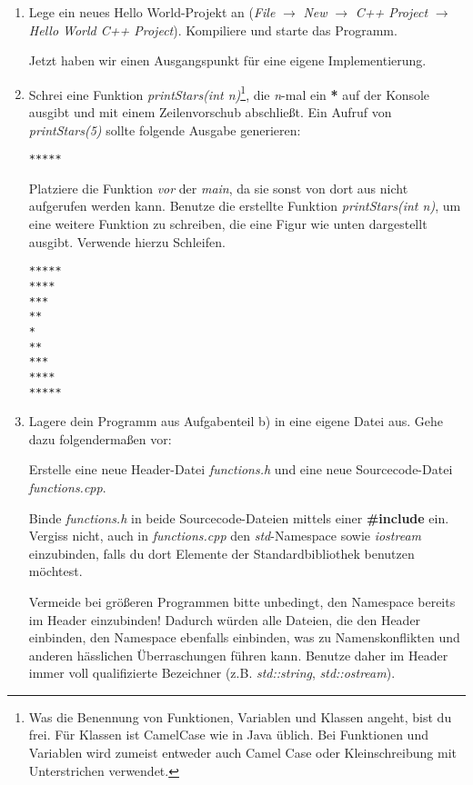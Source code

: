 \begin{enumerate}

\item Lege ein neues \glqq{}Hello World\grqq{}-Projekt an (\emph{File} $\rightarrow$ \emph{New} $\rightarrow$ \emph{C++ Project} $\rightarrow$ \emph{Hello World C++ Project}).
Kompiliere und starte das Programm.

Jetzt haben wir einen Ausgangspunkt für eine eigene Implementierung.


\item 
Schrei eine Funktion \emph{printStars(int n)}\footnote{Was die Benennung von Funktionen, Variablen und Klassen angeht, bist du frei.
Für Klassen ist CamelCase wie in Java üblich. Bei Funktionen und Variablen wird zumeist entweder auch Camel Case oder Kleinschreibung mit Unterstrichen verwendet.}, die \emph{n}-mal ein \textbf{*} auf der Konsole ausgibt und mit einem Zeilenvorschub abschließt.
Ein Aufruf von \emph{printStars(5)} sollte folgende Ausgabe generieren:
\begin{lstlisting}
*****
\end{lstlisting}

Platziere die Funktion \emph{vor} der \emph{main}, da sie sonst von dort aus nicht aufgerufen werden kann.
Benutze die erstellte Funktion \emph{printStars(int n)}, um eine weitere Funktion zu schreiben, die eine Figur wie unten dargestellt ausgibt.
Verwende hierzu Schleifen.
\begin{lstlisting}
*****
****
***
**
*
**
***
****
*****
\end{lstlisting}

\item
Lagere dein Programm aus Aufgabenteil b) in eine eigene Datei aus.
Gehe dazu folgendermaßen vor: 

Erstelle eine neue Header-Datei \emph{functions.h} und eine neue Sourcecode-Datei \emph{functions.cpp}. 

Binde \emph{functions.h} in beide Sourcecode-Dateien mittels 
einer \textbf{\#include} ein.
Vergiss nicht, auch in \emph{functions.cpp} den \emph{std}-Namespace sowie \emph{iostream} einzubinden, falls du dort Elemente der Standardbibliothek benutzen möchtest.

Vermeide bei größeren Programmen bitte unbedingt, den Namespace bereits im Header einzubinden!
Dadurch würden alle Dateien, die den Header einbinden, den Namespace ebenfalls einbinden, was zu Namenskonflikten und anderen hässlichen Überraschungen führen kann.
Benutze daher im Header immer voll qualifizierte Bezeichner (z.B. \emph{std::string}, \emph{std::ostream}).


\end{enumerate}
